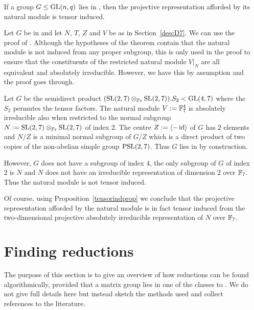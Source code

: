 \begin{Prop}
    \label{tensorindprop}
%
If a group $G \le \GL(n,q)$ lies in , then the projective
representation afforded by its natural module is tensor induced.
\end{Prop}
\proofbeg
Let $G$ be in  and let $N$, $T$, $Z$ and $V$ be as in
Section~\ref{descD7}.
We can use the proof of \cite[Tensor Induction Theorem]{kovacs}. 
Although the hypotheses of
the theorem contain that the natural module is not induced from any
proper subgroup, this is only used in the proof to ensure that the
constituents of the restricted natural module $V|_N$ are all
equivalent and absolutely irreducible. However, we have this by
assumption and the proof goes through.
\proofend

\begin{Rem}
    \label{nottensorind}
%
    Let $G$ be the semidirect product 
    $(\SL(2,7) \otimes_{\F_7} \SL(2,7)).S_2 < \GL(4,7)$ where the
    $S_2$ permutes the tensor factors. The natural module $V := \mathbb{F}_7^4$ is
    absolutely irreducible also when restricted to the normal subgroup
    $N := \SL(2,7) \otimes_{\F_7} \SL(2,7)$ of index $2$. The centre 
    $Z := \left< -\id \right>$ of $G$ has $2$ elements and $N/Z$ is a
    minimal normal subgroup of $G/Z$ which is a direct product of two
    copies of the non-abelian simple group $\PSL(2,7)$. Thus $G$ lies
    in  by construction.

    However, $G$ does not have a subgroup of index $4$, the only 
    subgroup of $G$ of index $2$ is $N$ and $N$ does
    not have an irreducible representation of dimension $2$ over
    $\mathbb{F}_7$. Thus the natural module is not tensor induced.

    Of course, using Proposition~\ref{tensorindprop} we conclude that
    the projective representation afforded by the natural module is in
    fact tensor induced from the two-dimensional projective
    absolutely irreducible representation of $N$ over $\mathbb{F}_7$.
\end{Rem}

\section{Finding reductions}
\label{findred}
%

The purpose of this section is to give an overview of how reductions can
be found algorithmically, provided that a matrix group
lies in one of the classes  to . We do not give full details
here but instead sketch the methods used and collect references to the
literature.

